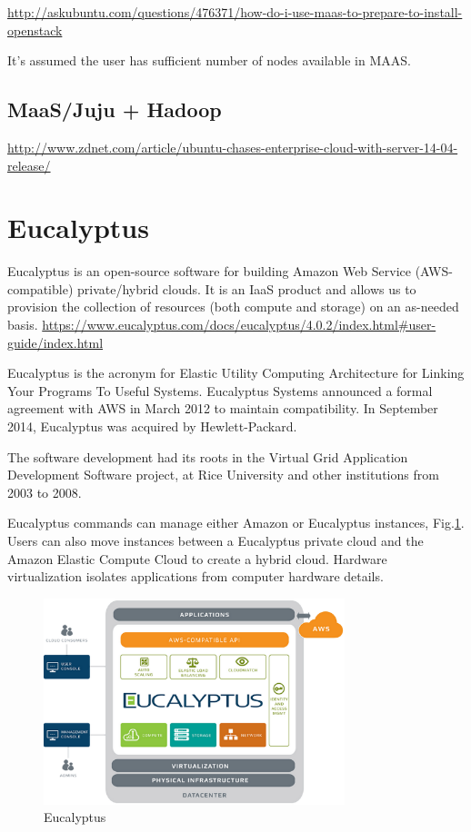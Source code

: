 \url{http://askubuntu.com/questions/476371/how-do-i-use-maas-to-prepare-to-install-openstack}

It's assumed the user has sufficient number of nodes available in MAAS.



\subsection{MaaS/Juju + Hadoop}
\label{sec:MaaS_Hadoop}




\url{http://www.zdnet.com/article/ubuntu-chases-enterprise-cloud-with-server-14-04-release/}

\section{Eucalyptus}
\label{sec:Eucalyptus}

Eucalyptus is an open-source software for building Amazon Web
Service (AWS-compatible) private/hybrid clouds. It is an IaaS product and allows
us to provision the collection of resources (both compute and storage) on an as-needed basis.
\url{https://www.eucalyptus.com/docs/eucalyptus/4.0.2/index.html\#user-guide/index.html}

Eucalyptus is the acronym for Elastic Utility Computing Architecture for Linking
Your Programs To Useful Systems. Eucalyptus Systems announced a formal agreement
with AWS in March 2012 to maintain compatibility. In September 2014, Eucalyptus
was acquired by Hewlett-Packard.

The software development had its roots in the Virtual Grid Application
Development Software project, at Rice University and other institutions from
2003 to 2008. 

Eucalyptus commands can manage either Amazon or Eucalyptus instances,
Fig.\ref{fig:Eucalyptus}. Users can also move instances between a Eucalyptus
private cloud and the Amazon Elastic Compute Cloud to create a hybrid cloud. Hardware virtualization isolates
applications from computer hardware details.


\begin{figure}[hbt]
  \centerline{\includegraphics[height=6cm,
    angle=0]{./images/Eucalyptus.eps}}
\caption{Eucalyptus}
\label{fig:Eucalyptus}
\end{figure}

